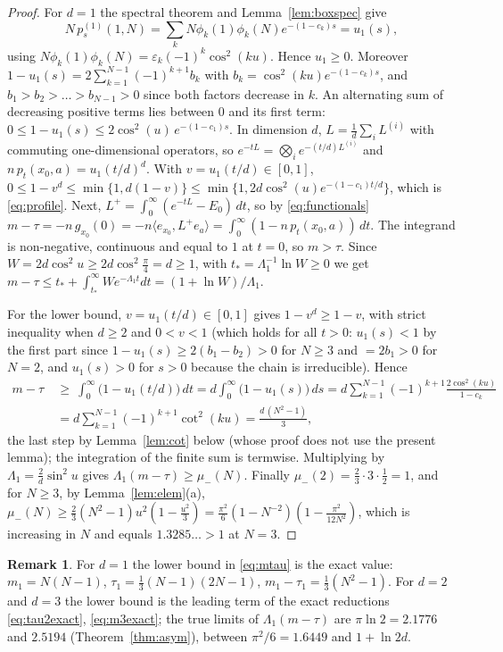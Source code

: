 \documentclass[11pt,a4paper]{article}
\newcommand{\ip}[2]{\langle #1,#2\rangle}
\theoremstyle{plain}
\theoremstyle{definition}
\newtheorem{remark}[theorem]{Remark}
\numberwithin{equation}{section}
\begin{document}
\begin{proof}
For $d=1$ the spectral theorem and Lemma~\ref{lem:boxspec} give
\[N\,p^{(1)}_s(1,N)=\sum_{k}N\phi_k(1)\phi_k(N)e^{-(1-c_k)s}=u_1(s),\]
using $N\phi_k(1)\phi_k(N)=\varepsilon_k(-1)^k\cos^2(ku)$. Hence $u_1\ge0$. Moreover $1-u_1(s)=2\sum_{k=1}^{N-1}(-1)^{k+1}b_k$ with $b_k=\cos^2(ku)e^{-(1-c_k)s}$, and $b_1>b_2>\dots>b_{N-1}>0$ since both factors decrease in $k$. An alternating sum of decreasing positive terms lies between $0$ and its first term: $0\le1-u_1(s)\le2\cos^2(u)\,e^{-(1-c_1)s}$. In dimension $d$, $L=\frac1d\sum_iL^{(i)}$ with commuting one-dimensional operators, so $e^{-tL}=\bigotimes_ie^{-(t/d)L^{(i)}}$ and $n\,p_t(x_0,a)=u_1(t/d)^d$. With $v=u_1(t/d)\in[0,1]$, $0\le1-v^d\le\min\{1,d(1-v)\}\le\min\{1,2d\cos^2(u)e^{-(1-c_1)t/d}\}$, which is \eqref{eq:profile}.
Next, $L^+=\int_0^\infty(e^{-tL}-E_0)\,dt$, so by \eqref{eq:functionals} $m-\tau=-n\,g_{x_0}(0)=-n\ip{e_{x_0}}{L^+e_a}=\int_0^\infty(1-n\,p_t(x_0,a))\,dt$. The integrand is non-negative, continuous and equal to $1$ at $t=0$, so $m>\tau$. Since $W=2d\cos^2u\ge2d\cos^2\frac\pi4=d\ge1$, with $t_*=\Lambda_1^{-1}\ln W\ge0$ we get $m-\tau\le t_*+\int_{t_*}^\infty We^{-\Lambda_1t}dt=(1+\ln W)/\Lambda_1$.

For the lower bound, $v=u_1(t/d)\in[0,1]$ gives $1-v^d\ge1-v$, with strict inequality when $d\ge2$ and $0<v<1$ (which holds for all $t>0$: $u_1(s)<1$ by the first part since $1-u_1(s)\ge2(b_1-b_2)>0$ for $N\ge3$ and $=2b_1>0$ for $N=2$, and $u_1(s)>0$ for $s>0$ because the chain is irreducible). Hence
\begin{align*}
m-\tau\ &\ge\ \int_0^\infty\big(1-u_1(t/d)\big)\,dt=d\int_0^\infty\big(1-u_1(s)\big)\,ds=d\sum_{k=1}^{N-1}(-1)^{k+1}\frac{2\cos^2(ku)}{1-c_k}\\
&=d\sum_{k=1}^{N-1}(-1)^{k+1}\cot^2(ku)=\frac{d\,(N^2-1)}3 ,
\end{align*}
the last step by Lemma~\ref{lem:cot} below (whose proof does not use the present lemma); the integration of the finite sum is termwise. Multiplying by $\Lambda_1=\frac2d\sin^2u$ gives $\Lambda_1(m-\tau)\ge\mu_-(N)$. Finally $\mu_-(2)=\frac23\cdot3\cdot\frac12=1$, and for $N\ge3$, by Lemma~\ref{lem:elem}(a), $\mu_-(N)\ge\frac23(N^2-1)u^2(1-\frac{u^2}3)=\frac{\pi^2}{6}(1-N^{-2})(1-\frac{\pi^2}{12N^2})$, which is increasing in $N$ and equals $1.3285\ldots>1$ at $N=3$.
\end{proof}
\begin{remark}
For $d=1$ the lower bound in \eqref{eq:mtau} is the exact value: $m_1=N(N-1)$, $\tau_1=\frac13(N-1)(2N-1)$, $m_1-\tau_1=\frac13(N^2-1)$. For $d=2$ and $d=3$ the lower bound is the leading term of the exact reductions \eqref{eq:tau2exact}, \eqref{eq:m3exact}; the true limits of $\Lambda_1(m-\tau)$ are $\pi\ln2=2.1776$ and $2.5194$ (Theorem~\ref{thm:asym}), between $\pi^2/6=1.6449$ and $1+\ln2d$.
\end{remark}
\end{document}
